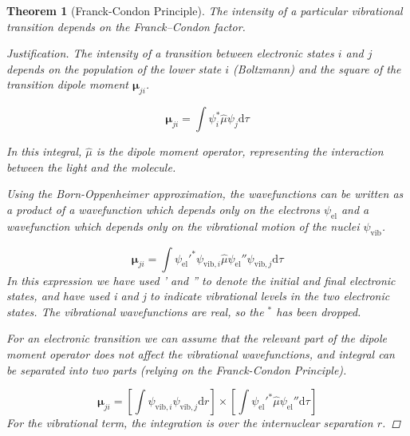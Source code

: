 \documentclass[a4paper]{tufte-handout}
\newtheorem{theorem}{Theorem}
\newenvironment{justification} {\begin{proof}[Justification]} {\end{proof}}
\theoremstyle{definition}
\begin{document}
\begin{theorem}[Franck-Condon Principle] The intensity of a particular vibrational transition depends on the Franck–Condon factor.

  \begin{justification}
    The intensity of a transition between electronic states $i$ and $j$ depends on the population of the lower state $i$ (Boltzmann)
    and the square of the transition dipole moment $\boldsymbol{\mu}_{ji}$.

    \begin{equation*}
      \boldsymbol{\mu}_{ji} = \int \psi_i^* \hat{\mu} \psi_j \mathrm{d} \tau
    \end{equation*}

    In this integral, $\hat{\mu}$ is the dipole moment operator, representing the interaction between the light
    and the molecule.

    Using the Born-Oppenheimer approximation, the wavefunctions can be written as a product of a wavefunction 
    which depends only on the electrons $\psi_{\mathrm{el}}$ and a wavefunction which depends only on the 
    vibrational motion of the nuclei $\psi_{\mathrm{vib}}$.

    \begin{equation*}
      \boldsymbol{\mu}_{ji} = \int \psi_{\mathrm{el}}'^* \psi_{\mathrm{vib},i} \hat{\mu} \psi_{\mathrm{el}}'' \psi_{\mathrm{vib,}j} \mathrm{d} \tau
    \end{equation*}
    In this expression we have used ' and '' to denote the initial and final electronic states, and have used i and j to indicate vibrational 
    levels in the two electronic states. The vibrational wavefunctions are real, so the $^*$ has been dropped.

    For an electronic transition we can assume that the relevant part of the dipole moment operator does not affect the vibrational wavefunctions, and
    integral can be separated into two parts (relying on the Franck-Condon Principle).

    \begin{equation*}
      \boldsymbol{\mu}_{ji} = \left[ \int\psi_{\mathrm{vib},i} \psi_{\mathrm{vib,}j}\mathrm{d}r  \right] \times  \left[\int \psi_{\mathrm{el}}'^* \hat{\mu} \psi_{\mathrm{el}}'' \mathrm{d}\tau \right] 
    \end{equation*}
    For the vibrational term, the integration is over the internuclear separation $r$.
    

\end{justification}
\end{theorem}
\end{document}
